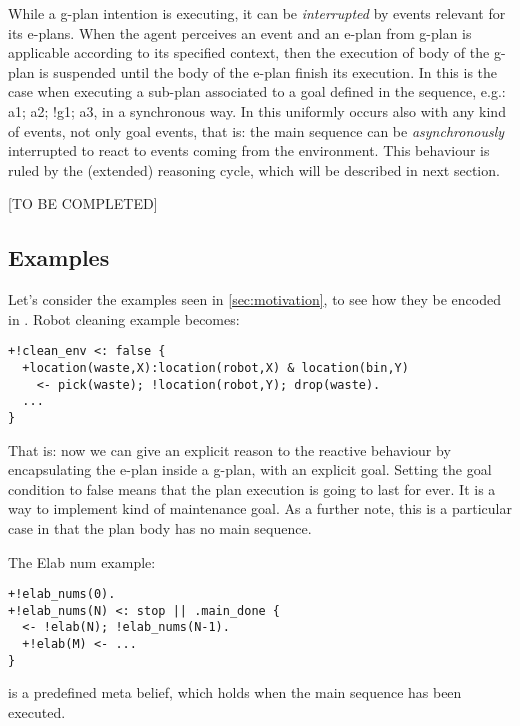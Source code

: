 While a g-plan intention is executing, it can be \emph{interrupted} by events relevant for its e-plans. When the agent perceives an event and an e-plan from g-plan is applicable according to its specified context, then the execution of body of the g-plan is suspended until the body of the e-plan finish its execution.
%
In {\asl} this is the case when executing a sub-plan associated to a goal defined in the sequence, e.g.: \textsf{a1; a2; !g1; a3}, in a synchronous way.
%
In {\aser} this uniformly occurs also with any kind of events, not only goal events, that is:
%
the main sequence can be \emph{asynchronously} interrupted to react to events coming from the environment.
%
This behaviour is ruled by the (extended) reasoning cycle, which will be described in next section.


[TO BE COMPLETED]

\subsection{Examples}

Let's consider  the examples seen in {\ref{sec:motivation}},  to see how they be encoded in {\aser}. 
%
Robot cleaning example becomes:

\begin{small}
\begin{verbatim}
+!clean_env <: false {
  +location(waste,X):location(robot,X) & location(bin,Y)
    <- pick(waste); !location(robot,Y); drop(waste).
  ...
}
\end{verbatim}
\end{small}

\noindent That is: now we can give an explicit reason to the reactive behaviour by encapsulating the e-plan inside a g-plan, with an explicit goal.
%
Setting the goal condition to false means that  the plan execution is going to last for ever. It is a way to implement kind of maintenance goal.
%
As a further note, this is a particular case in that the plan body has no main sequence.
%

The Elab num example:

{\small
\begin{verbatim}
+!elab_nums(0).
+!elab_nums(N) <: stop || .main_done {
  <- !elab(N); !elab_nums(N-1).	
  +!elab(M) <- ...
}
\end{verbatim}}

%
 is a predefined meta belief, which holds when the main sequence has been executed. 

